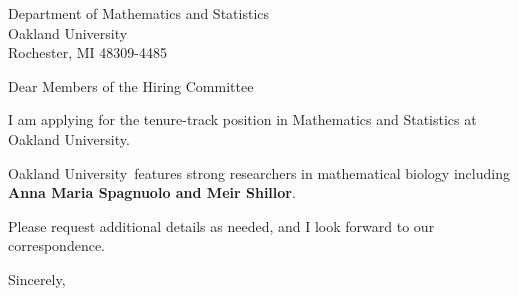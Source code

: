 




	
	
	\def\School{Oakland University}
	
	\begin{letter}
		{Department of Mathematics and Statistics\\
			Oakland University\\
			Rochester, MI 48309-4485
		}
		
		\opening{Dear Members of the Hiring Committee}
		
		
		I am applying for the tenure-track position in Mathematics and Statistics at \School. 
		
		\School~features strong researchers in mathematical biology including \textbf{Anna Maria Spagnuolo and Meir Shillor}. 
		
		
		
		
		
		Please request additional details as needed, and I look forward to our correspondence.
		
		\closing{Sincerely,}
	\end{letter}
